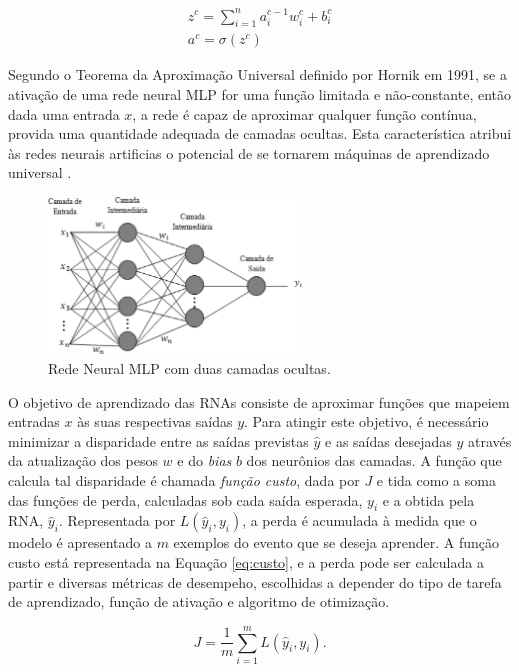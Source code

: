 \begin{gather}\label{eq:funcao_neuronio_camadas}
	z^c = \sum_{i=1}^n a_i^{c-1} w_i^c + b_i^c\\
	a^c = \sigma(z^c)
\end{gather}

Segundo o Teorema da Aproximação Universal definido por Hornik em 1991, se a ativação de uma rede neural MLP for uma função limitada e não-constante, então dada uma entrada $x$, a rede é capaz de aproximar qualquer função contínua, provida uma quantidade adequada de camadas ocultas. Esta característica atribui às redes neurais artificias o potencial de se tornarem máquinas de aprendizado universal \cite{hornik1991approximation}.

\begin{figure}[ht]
	\centering
	\caption{Rede Neural MLP com duas camadas ocultas.}
	\label{fig:mlp}
	\includegraphics[width=0.6\textwidth]{img/mlprna.jpg}
\end{figure}

O objetivo de aprendizado das RNAs consiste de aproximar funções que mapeiem entradas $x$ às suas respectivas saídas $y$. Para atingir este objetivo, é necessário minimizar a disparidade entre as saídas previstas $\hat{y}$ e as saídas desejadas $y$ através da atualização dos pesos $w$ e do \emph{bias} $b$ dos neurônios das camadas. A função que calcula tal disparidade é chamada \emph{função custo}, dada por $J$ e tida como a soma das funções de perda, calculadas sob cada saída esperada, $y_i$ e a obtida pela RNA, $\hat{y}_i$. Representada por $L(\hat{y}_i, y_i)$, a perda é acumulada à medida que o modelo é apresentado a $m$ exemplos do evento que se deseja aprender. A função custo está representada na Equação \ref{eq:custo}, e a perda pode ser calculada a partir e diversas métricas de desempeho, escolhidas a depender do tipo de tarefa de aprendizado, função de ativação e algoritmo de otimização.

\begin{equation}\label{eq:custo}
J = \frac{1}{m} \sum_{i=1}^{m} L(\hat{y}_{i}, y_{i}).
\end{equation}

